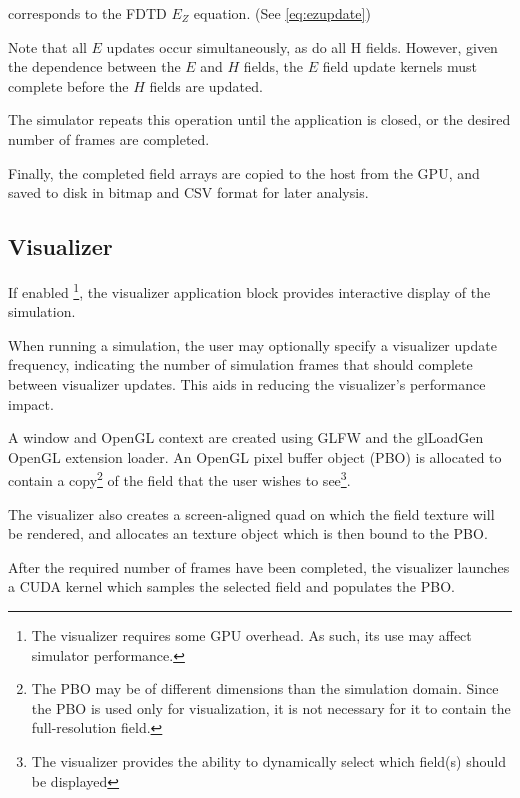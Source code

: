 corresponds to the FDTD $E_Z$ equation. (See \autoref{eq:ezupdate})

\label{listing:updateHxCpp}

\label{listing:updateHyCpp}

Note that all $E$ updates occur simultaneously, as do all H fields. However, given the dependence between the $E$ and $H$ fields, the $E$ field update kernels must complete before the $H$ fields are updated.

The simulator repeats this operation until the application is closed, or the desired number of frames are completed. 

Finally, the completed field arrays are copied to the host from the GPU, and saved to disk in bitmap and CSV format for later analysis. 

\subsection{Visualizer}\label{sec:visualizer}

If enabled \footnote{The visualizer requires some GPU overhead. As such, its use may affect simulator performance.}, the visualizer application block provides interactive display of the simulation. 

When running a simulation, the user may optionally specify a visualizer update frequency, indicating the number of simulation frames that should complete between visualizer updates. This aids in reducing the visualizer's performance impact.

A window and OpenGL context are created using GLFW and the glLoadGen OpenGL extension loader. An OpenGL pixel buffer object (PBO) is allocated to contain a copy\footnote{The PBO may be of different dimensions than the simulation domain. Since the PBO is used only for visualization, it is not necessary for it to contain the full-resolution field.} of the field that the user wishes to see\footnote{The visualizer provides the ability to dynamically select which field(s) should be displayed}. 

The visualizer also creates a screen-aligned quad on which the field texture will be rendered, and allocates an texture object which is then bound to the PBO. 

After the required number of frames have been completed, the visualizer launches a CUDA kernel which samples the selected field and populates the PBO. 

